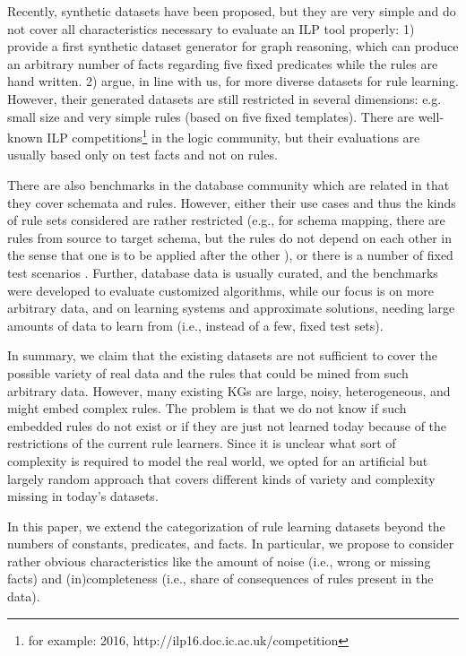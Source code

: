 \documentclass[letterpaper]{article} \usepackage{aaai20}  \usepackage{times}  \usepackage{helvet} \usepackage{courier}  \usepackage[hyphens]{url}  \usepackage{graphicx} \urlstyle{rm} \def\UrlFont{\rm}  \usepackage{graphicx}  \frenchspacing  \setlength{\pdfpagewidth}{8.5in}  \setlength{\pdfpageheight}{11in}  \usepackage{amsthm}
\theoremstyle{definition}
\newcommand{\citet}[1]{\citeauthor{#1} \shortcite{#1}}
\begin{document}
Recently, synthetic datasets have been proposed, but they are very simple and do not cover all characteristics necessary to evaluate an ILP tool properly: 
1) \citet{Dong+-ICLR19:nlms} provide a first synthetic dataset generator for graph reasoning,
which can produce an arbitrary number of facts regarding five fixed predicates while the rules are hand written.
2) \citet{on_the_fly} argue, in line with us, for more diverse datasets for rule learning. However, their generated datasets are still restricted in several dimensions: e.g. small size and very simple rules (based on five fixed templates).
There are well-known ILP competitions\footnote{for example: 2016, http://ilp16.doc.ic.ac.uk/competition} in the logic community, but their evaluations are usually based only on test facts and not on rules. 

There are also benchmarks in the database community which are related in that they cover schemata and rules. However, either their use cases and thus the kinds of rule sets considered are rather restricted (e.g., for schema mapping, there are rules from source to target schema, but the rules do not depend on each other in the sense that one is to be applied after the other \cite{Alexe08-stbench,ibench}), or there is a number of fixed test scenarios \cite{Benedikt17-chasebench}. Further, database data is usually curated, and the benchmarks were developed to evaluate customized algorithms, while our focus is on more arbitrary data, and on learning systems and approximate solutions, needing large amounts of data to learn from (i.e., instead of a few, fixed test sets).

In summary, we claim that the existing datasets are not sufficient to cover the possible variety of real data and the rules that could be mined from such arbitrary data. 
However, many existing KGs are large, noisy, heterogeneous, and might embed complex rules. The problem is that we do not know if such embedded rules do not exist or if they are just not learned today because of the restrictions of the current rule learners. 
Since it is unclear what sort of complexity is required to model the real world, we opted for an artificial but largely random approach 
that covers different kinds of variety and complexity missing in today's datasets.


In this paper, 
we extend the categorization of rule learning datasets beyond the numbers of constants, predicates, and facts. In particular, we propose to consider rather obvious characteristics like the amount of noise (i.e., wrong or missing facts) and  (in)completeness (i.e., share of consequences of rules present in the data).
 
\end{document}
